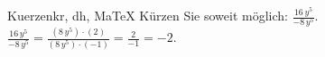 \begin{MAufgabe}{Kuerzen}{kr, dh, MaTeX}
K\"urzen Sie soweit m\"oglich: $\frac{16\, y^5}{- 8\, y^5}$.\\ 
\ifLsg\MLoesung
\quad $\frac{16\, y^5}{- 8\, y^5}=\frac{(8\, y^5)\cdot(2)}{(8\, y^5)\cdot(-1)}=\frac{2}{-1}=-2$.\else\relax\fi
 \end{MAufgabe}